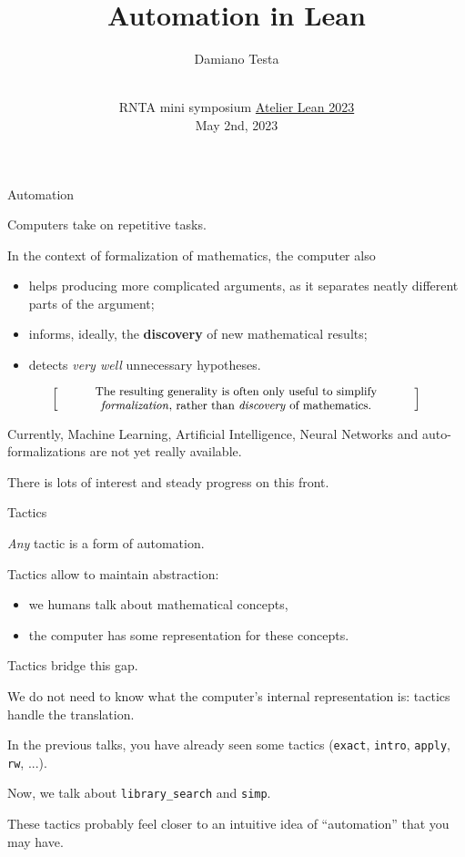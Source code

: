 \documentclass{beamer}
\title{Automation in Lean}
\author{Damiano Testa}
\institute[]{University of Warwick}
\date[\href{http://www.rnta.eu/7MSRNTA/lean.html}{Atelier Lean 2023}]{\\
\vspace{50pt}
RNTA mini symposium
\href{http://www.rnta.eu/7MSRNTA/lean.html}{Atelier Lean 2023}\\
\vspace{20pt}
May 2nd, 2023
}
\begin{document}
\frame{\titlepage}

\begin{frame}[fragile]
{Automation}

Computers take on repetitive tasks.

In the context of formalization of mathematics, the computer also

\vspace{-13pt}
\begin{itemize}
\setlength\itemsep{-12pt}
\item
  helps producing more complicated arguments, as it separates neatly different parts of the argument;
\item
  informs, ideally, the {\textbf{discovery}} of new mathematical results;
\item
  detects {\emph{very well}} unnecessary hypotheses.
\end{itemize}

\[
  \left[ \;
  \parbox{0.8\textwidth}{\centering\small
  The resulting generality is often only useful to simplify {\emph{formalization}}, rather than {\emph{discovery}} of mathematics.
  }
  \; \right]
\]

Currently, Machine Learning, Artificial Intelligence, Neural Networks and auto-formalizations are not yet really available.

There is lots of interest and steady progress on this front.
\end{frame}

\begin{frame}[fragile]{Tactics}

{\emph{Any}} tactic is a form of automation.

Tactics allow to maintain abstraction:

\vspace{-13pt}
\begin{itemize}
\setlength\itemsep{-12pt}
\item
  we humans talk about mathematical concepts,
\item
  the computer has some representation for these concepts.
\end{itemize}

Tactics bridge this gap.

We do not need to know what the computer's internal representation is: tactics handle the translation.
\end{frame}

\begin{frame}[fragile]

In the previous talks, you have already seen some tactics ({\color{violet}\verb`exact`}, {\color{violet}\verb`intro`}, {\color{violet}\verb`apply`}, {\color{violet}\verb`rw`}, ...).

Now, we talk about {\color{violet}\verb`library_search`} and {\color{violet}\verb`simp`}.

These tactics probably feel closer to an intuitive idea of ``automation'' that you may have.
\end{frame}
\end{document}
